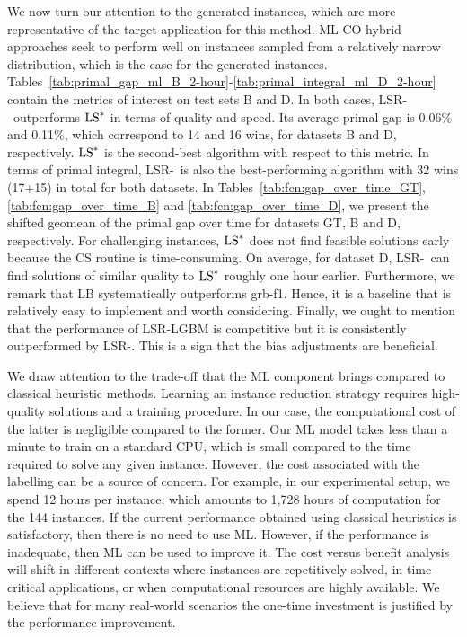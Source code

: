 \documentclass[3p, authoryear, times, doubleblind]{elsarticle}
\begin{document}
{We now turn our attention to the generated instances, which are more representative of the target application for this method. ML-CO hybrid approaches seek to perform well on instances sampled from a relatively narrow distribution, which is the case for the generated instances.  Tables~\ref{tab:primal_gap_ml_B_2-hour}-\ref{tab:primal_integral_ml_D_2-hour} contain the metrics of interest on test sets B and D. In both cases, LSR-\lgbmb\ outperforms $\text{LS}^*$ in terms of quality and speed. Its average primal gap is 0.06\% and 0.11\%, which correspond to 14 and 16 wins, for datasets B and D, respectively. $\text{LS}^*$ is the second-best algorithm with respect to this metric. In terms of primal integral,  LSR-\lgbmb\ is also the best-performing algorithm with 32 wins (17+15) in total for both datasets. \startblue  In Tables~\ref{tab:fcn:gap_over_time_GT}, \ref{tab:fcn:gap_over_time_B} and \ref{tab:fcn:gap_over_time_D}, we present the shifted geomean of the primal gap over time for datasets GT, B and D, respectively. For challenging instances, $\text{LS}^*$ does not find feasible solutions early because the CS routine is time-consuming. On average, for dataset D, LSR-\lgbmb\ can find solutions of similar quality to $\text{LS}^*$ roughly one hour earlier.  \stopblue Furthermore, we remark that LB systematically outperforms grb-f1. Hence, it is a baseline that is relatively easy to implement and worth considering. Finally, we ought to mention that the performance of LSR-LGBM is competitive but it is consistently outperformed by LSR-\lgbmb. This is a sign that the bias adjustments are beneficial.

\startblue 
We draw attention to the trade-off that the ML component brings compared to classical heuristic methods. Learning an instance reduction strategy requires high-quality solutions and a training procedure. In our case, the computational cost of the latter is negligible compared to the former. Our ML model takes less than a minute to train on a standard CPU, which is small compared to the time required to solve any given instance. However, the cost associated with the labelling can be a source of concern. For example, in our experimental setup, we spend 12 hours per instance, which amounts to 1,728 hours of computation for the 144 instances. If the current performance obtained using classical heuristics is satisfactory, then there is no need to use ML. However, if the performance is inadequate, then ML can be used to improve it. The cost versus benefit analysis will shift in different contexts where instances are repetitively solved, in time-critical applications, or when computational resources are highly available. We believe that for many real-world scenarios the one-time investment is justified by the performance improvement. \stopblue 

}
\end{document}
